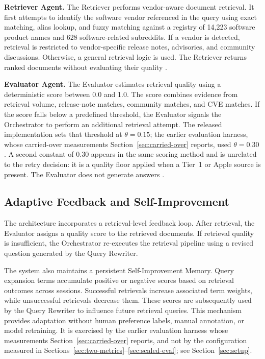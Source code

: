 \documentclass[acmsmall,review,anonymous,screen]{acmart}
\begin{document}
\textbf{Retriever Agent.}
The Retriever performs vendor-aware document retrieval. It first
attempts to identify the software vendor referenced in the query using
exact matching, alias lookup, and fuzzy matching against a registry of
14,223 software product names and 628 software-related subreddits. If a
vendor is detected, retrieval is restricted to vendor-specific
release notes, advisories, and community discussions. Otherwise, a
general retrieval logic is used. The Retriever returns ranked
documents without evaluating their quality \cite{guan2025, zheng2026, yang2026}.

\textbf{Evaluator Agent.}
The Evaluator estimates retrieval quality using a deterministic score
between 0.0 and 1.0. The score combines evidence from retrieval
volume, release-note matches, community matches, and CVE matches. If
the score falls below a predefined threshold, the Evaluator signals the
Orchestrator to perform an additional retrieval attempt. The released
implementation sets that threshold at $\theta = 0.15$; the earlier
evaluation harness, whose carried-over measurements
Section~\ref{sec:carried-over} reports, used $\theta = 0.30$. A second
constant of 0.30 appears in the same scoring method and is unrelated to the
retry decision: it is a quality floor applied when a Tier~1 or Apple source
is present. The Evaluator does not generate answers \cite{zhuge2024}.

\subsection{Adaptive Feedback and Self-Improvement}

The architecture incorporates a retrieval-level feedback loop. After
retrieval, the Evaluator assigns a quality score to the retrieved
documents. If retrieval quality is insufficient, the Orchestrator
re-executes the retrieval pipeline using a revised question generated by
the Query Rewriter.

The system also maintains a persistent Self-Improvement Memory. Query
expansion terms accumulate positive or negative scores based on
retrieval outcomes across sessions. Successful retrievals increase
associated term weights, while unsuccessful retrievals decrease them.
These scores are subsequently used by the Query Rewriter to influence
future retrieval queries. This mechanism provides adaptation without
human preference labels, manual annotation, or model retraining. It is
exercised by the earlier evaluation harness whose measurements
Section~\ref{sec:carried-over} reports, and not by the configuration measured
in Sections~\ref{sec:two-metrics}--\ref{sec:scaled-eval}; see
Section~\ref{sec:setup}.
\end{document}
